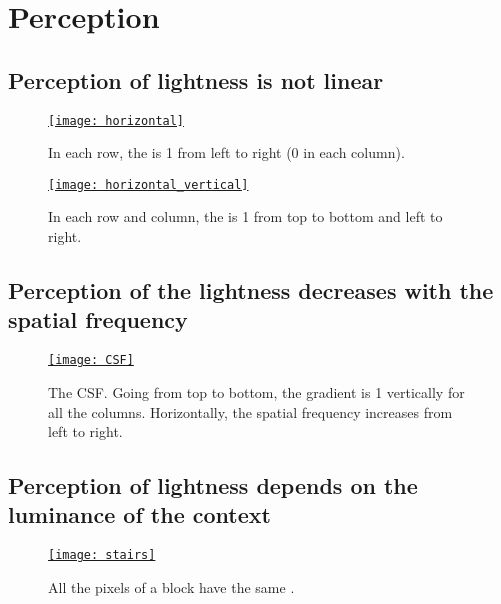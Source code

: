 \chapter{Perception}

\section{Perception of lightness \cite{wikipedia_lightness} is not linear}
\begin{figure}[H]
  \centering
  \href{https://github.com/vicente-gonzalez-ruiz/medical_imaging/blob/main/notebooks/horizontal_vertical.ipynb}{\texttt{[image: horizontal]}}
  \caption[Perception of lightness (brightness) is not linear (1).]{In each row, the  is 1 from left to right (0 in each column).}
  \label{fig:HVS_no_linear}
\end{figure}

\begin{figure}[H]
  \centering
  \href{https://github.com/vicente-gonzalez-ruiz/medical_imaging/blob/main/notebooks/horizontal_vertical.ipynb}{\texttt{[image: horizontal\_vertical]}}
  \caption[Perception of lightness is not linear (2).]{In each row and column, the  is 1 from top to bottom and left to right.}
  \label{fig:HVS_no_linear}
\end{figure}

\section{Perception of the lightness decreases with the spatial frequency}
\begin{figure}[H]
  \centering
  \href{https://github.com/vicente-gonzalez-ruiz/medical_imaging/blob/main/notebooks/CSF.ipynb}{\texttt{[image: CSF]}}
  \caption[Lightness VS spatial frequency (the \gls{CSF}).]{The
    \gls{CSF}. Going from top to bottom, the gradient is 1 vertically
    for all the columns. Horizontally, the spatial frequency increases
    from left to right.}
  \label{fig:CSF}
\end{figure}

\section{Perception of lightness depends on the luminance of the context}
\begin{figure}[H]
  \centering
  \href{https://github.com/vicente-gonzalez-ruiz/medical_imaging/blob/main/notebooks/stairs.ipynb}{\texttt{[image: stairs]}}
  \caption[Lightness VS surrounding luminance (1).]{All the pixels of a block have the same .}
  \label{fig:stairs}
\end{figure}

